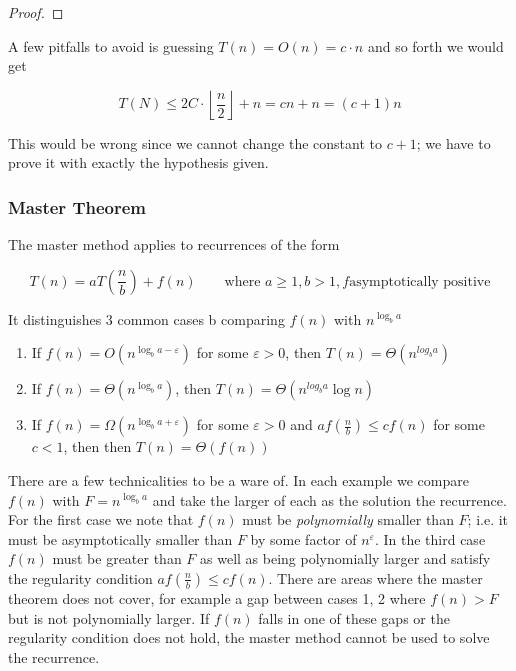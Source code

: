 \documentclass[../notes.tex]{subfiles}
\begin{document}
\begin{example}
\begin{proof}
	\end{proof}

	A few pitfalls to avoid is guessing $ T(n) = O(n) = c \cdot  n $ and so forth we would get

	\begin{equation}
		T(N) \le  2 C \cdot  \left\lfloor \frac{n}{2} \right\rfloor + n = cn+n = (c+1)n
	\end{equation}

	This would be wrong since we cannot change the constant to $ c+1 $; we have to prove it with exactly the hypothesis given.
	
\end{example}

\subsubsection{Master Theorem}

\begin{definition}
	The master method applies to recurrences of the form 

	\begin{equation}
		T(n) = a T(\frac{n}{b}) + f(n) \qquad \text{where } a \ge 1, b >  1, f  \text{asymptotically positive}
	\end{equation}

	It distinguishes 3 common cases b comparing $ f(n)  $  with $ n^{\log_ba}$ 

	\begin{enumerate}
		\item If $ f(n) = O(n^{\log_ba - \varepsilon}) $ for some $ \varepsilon > 0 $, then $ T(n) = \Theta(n^{log_ba}) $ 
		\item If $ f(n) = \Theta(n^{\log_ba }) $, then $ T(n) = \Theta(n^{log_ba}\log n) $ 
		\item If $ f(n) = \Omega(n^{\log_ba + \varepsilon}) $ for some $ \varepsilon>0 $ and $ af(\frac{n}{b}) \le  c f(n) $ for some $ c < 1$, then then $ T(n) = \Theta(f(n)) $ 
	\end{enumerate}
\end{definition}


There are a few technicalities to be a ware of. 
In each example we compare $ f(n) $ with $ F = n^{\log_ba} $ and take the larger of each as the solution the recurrence. 
For the first case we note that $ f(n) $ must be \textit{polynomially} smaller than $ F $; i.e. it must be asymptotically smaller than $ F $ by some factor of $ n^\varepsilon $.
In the third case $ f(n)  $ must be greater than $ F $ as well as being polynomially larger and satisfy the regularity condition $ af(\frac{n}{b}) \le cf(n)$.
There are areas where the master theorem does not cover, for example a gap between cases 1, 2 where $ f(n) > F $ but is not polynomially larger. If $ f(n)  $ falls in one of these gaps or the regularity condition does not hold, the master method cannot be used to solve the recurrence.
\end{document}
